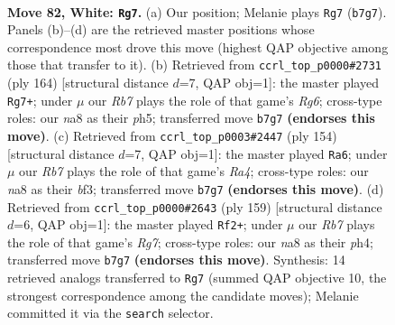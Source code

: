\documentclass[11pt]{article}
\begin{document}
\clearpage

\begin{figure}[p]\centering
\begin{subfigure}{0.46\textwidth}\centering
\resizebox{\linewidth}{!}{%
\newchessgame
\chessboard[
  setfen={n7/1R6/3k4/P7/8/7r/5K2/8 w - - 11 82},
  showmover=false,
  pgfstyle=straightmove, color=movearrow, markmove={b7-g7}
]}
\caption{}
\end{subfigure}\hfill
\begin{subfigure}{0.46\textwidth}\centering
\resizebox{\linewidth}{!}{%
\newchessgame
\chessboard[
  setfen={8/1k6/6R1/7p/1K5P/8/8/4r3 w - - 3 83},
  showmover=false,
  pgfstyle=straightmove, color=movearrow, markmove={g6-g7}
]}
\caption{}
\end{subfigure}
\\[4pt]
\begin{subfigure}{0.46\textwidth}\centering
\resizebox{\linewidth}{!}{%
\newchessgame
\chessboard[
  setfen={6r1/8/8/5k2/R7/5b2/5P1K/8 w - - 22 78},
  showmover=false,
  pgfstyle=straightmove, color=movearrow, markmove={a4-a6}
]}
\caption{}
\end{subfigure}\hfill
\begin{subfigure}{0.46\textwidth}\centering
\resizebox{\linewidth}{!}{%
\newchessgame
\chessboard[
  setfen={8/4k3/8/p4K2/7P/3R4/6r1/8 b - - 9 80},
  showmover=false,
  pgfstyle=straightmove, color=movearrow, markmove={g2-f2}
]}
\caption{}
\end{subfigure}
\caption{\textbf{Move 82, White: \texttt{Rg7}.} (a) Our position; Melanie plays \texttt{Rg7} (\texttt{b7g7}). Panels (b)--(d) are the retrieved master positions whose correspondence most drove this move (highest QAP objective among those that transfer to it). (b) Retrieved from \texttt{ccrl\_top\_p0000\#2731} (ply 164) [structural distance $d$=7, QAP obj=1]: the master played \texttt{Rg7+}; under $\mu$ our \emph{Rb7} plays the role of that game's \emph{Rg6}; cross-type roles: our \emph{n}a8 as their \emph{p}h5; transferred move \texttt{b7g7} \textbf{(endorses this move)}. (c) Retrieved from \texttt{ccrl\_top\_p0003\#2447} (ply 154) [structural distance $d$=7, QAP obj=1]: the master played \texttt{Ra6}; under $\mu$ our \emph{Rb7} plays the role of that game's \emph{Ra4}; cross-type roles: our \emph{n}a8 as their \emph{b}f3; transferred move \texttt{b7g7} \textbf{(endorses this move)}. (d) Retrieved from \texttt{ccrl\_top\_p0000\#2643} (ply 159) [structural distance $d$=6, QAP obj=1]: the master played \texttt{Rf2+}; under $\mu$ our \emph{Rb7} plays the role of that game's \emph{Rg7}; cross-type roles: our \emph{n}a8 as their \emph{p}h4; transferred move \texttt{b7g7} \textbf{(endorses this move)}. Synthesis: 14 retrieved analogs transferred to \texttt{Rg7} (summed QAP objective 10, the strongest correspondence among the candidate moves); Melanie committed it via the \texttt{search} selector.}
\label{fig:thought-m162}
\end{figure}
\end{document}
